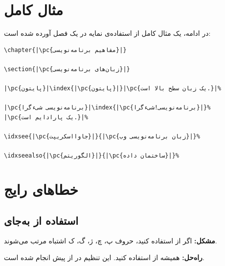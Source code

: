 
\section{مثال کامل}
\label{sec:index-example}

در ادامه، یک مثال کامل از استفاده‌ی نمایه در
یک فصل آورده شده است:

\begin{latin}
\begin{verbatim}
\chapter{|\pc{مفاهیم برنامه‌نویسی}|}

\section{|\pc{زبان‌های برنامه‌نویسی}|}

|\pc{پایتون}|\index{|\pc{پایتون}|}|\pc{یک زبان سطح بالا است.}|%

|\pc{برنامه‌نویسی شیءگرا}|\index{|\pc{برنامه‌نویسی!شیءگرا}|}%
|\pc{یک پارادایم است.}|%

\idxsee{|\pc{جاوااسکریپت}|}{|\pc{زبان برنامه‌نویسی وب}|}%

\idxseealso{|\pc{الگوریتم}|}{|\pc{ساختمان داده}|}%
\end{verbatim}
\end{latin}


\section{خطاهای رایج}
\label{sec:index-mistakes}

\subsection{استفاده از  به‌جای }
\label{sec:index-mistake-makeindex}

\textbf{مشکل:} اگر از  استفاده
کنید، حروف پ، چ، ژ، گ، ک اشتباه مرتب می‌شوند.

\textbf{راه‌حل:} همیشه از  استفاده
کنید. این تنظیم در  از پیش
انجام شده است.

